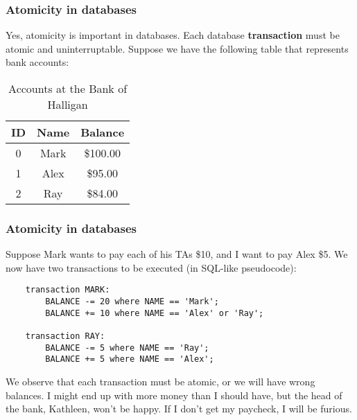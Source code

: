 \documentclass{beamer}
\theoremstyle{plain}
\begin{document}
\begin{frame}
  \frametitle{Atomicity in databases}
  Yes, atomicity is important in databases. Each database \textbf{transaction} must be atomic and
  uninterruptable. Suppose we have the following table that represents bank accounts:
  \begin{table}
    \begin{tabular}{| c | c | c |}
      \hline
      ID & Name & Balance\\
      \hline \hline
      0  & Mark & \$100.00\\
      \hline
      1  & Alex & \$95.00\\
      \hline
      2  & Ray  & \$84.00\\
      \hline
    \end{tabular}
    \caption{Accounts at the Bank of Halligan}
  \end{table}
  
\end{frame}

\begin{frame}[fragile]
  \frametitle{Atomicity in databases}
  Suppose Mark wants to pay each of his TAs \$10, and I want to pay Alex \$5. We now have two
  transactions to be executed (in SQL-like pseudocode):

  \pause
  
  \begin{lstlisting}
    transaction MARK:
        BALANCE -= 20 where NAME == 'Mark';
        BALANCE += 10 where NAME == 'Alex' or 'Ray';

    transaction RAY:
        BALANCE -= 5 where NAME == 'Ray';
        BALANCE += 5 where NAME == 'Alex';
  \end{lstlisting}
  \pause
  
  We observe that each transaction must be atomic, or we will have wrong balances. I might end up with more
  money than I should have, but the head of the bank, Kathleen, won't be happy. If I don't get my
  paycheck, I will be furious.
\end{frame}
\end{document}
